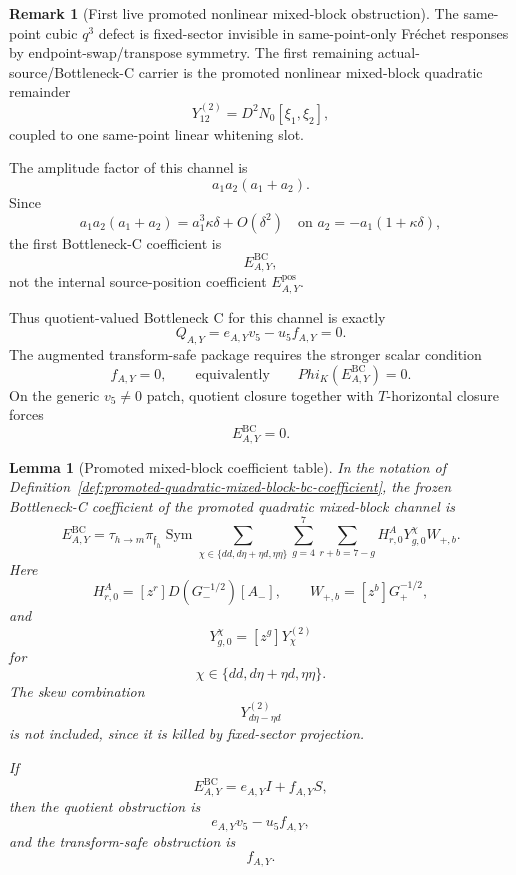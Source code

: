 \documentclass[11pt,a4paper]{amsart}
\def\Phi{Phi}%
\theoremstyle{plain}
\newtheorem{lemma}[theorem]{Lemma}
\theoremstyle{definition}
\newtheorem{remark}[theorem]{Remark}
\begin{document}
\begin{remark}[First live promoted nonlinear mixed-block obstruction]
\label{rem:first-live-promoted-y12-obstruction}
The same-point cubic \(q^3\) defect is fixed-sector invisible in same-point-only
Fr\'echet responses by endpoint-swap/transpose symmetry.  The first remaining
actual-source/Bottleneck-C carrier is the promoted nonlinear mixed-block
quadratic remainder
\[
Y_{12}^{(2)}=D^2N_0[\xi_1,\xi_2],
\]
coupled to one same-point linear whitening slot.

The amplitude factor of this channel is
\[
a_1a_2(a_1+a_2).
\]
Since
\[
a_1a_2(a_1+a_2)
=
a_1^3\kappa\delta+O(\delta^2)
\quad
\text{on }a_2=-a_1(1+\kappa\delta),
\]
the first Bottleneck-C coefficient is
\[
E_{A,Y}^{\mathrm{BC}},
\]
not the internal source-position coefficient \(E_{A,Y}^{\mathrm{pos}}\).

Thus quotient-valued Bottleneck C for this channel is exactly
\[
Q_{A,Y}=e_{A,Y}v_5-u_5f_{A,Y}=0.
\]
The augmented transform-safe package requires the stronger scalar condition
\[
f_{A,Y}=0,
\qquad
\text{equivalently}\qquad
\Phi_K(E_{A,Y}^{\mathrm{BC}})=0.
\]
On the generic \(v_5\ne0\) patch, quotient closure together with
\(T\)-horizontal closure forces
\[
E_{A,Y}^{\mathrm{BC}}=0.
\]
\end{remark}

\begin{lemma}[Promoted mixed-block coefficient table]
\label{lem:promoted-y12-coefficient-table}
In the notation of
Definition~\ref{def:promoted-quadratic-mixed-block-bc-coefficient}, the frozen
Bottleneck-C coefficient of the promoted quadratic mixed-block channel is
\[
E_{A,Y}^{\mathrm{BC}}
=
\tau_{h\to m}\pi_{\mathfrak f_h}
\operatorname{Sym}
\sum_{\chi\in\{dd,d\eta+\eta d,\eta\eta\}}
\sum_{g=4}^{7}
\sum_{r+b=7-g}
H^A_{r,0}Y^\chi_{g,0}W_{+,b}.
\]
Here
\[
H^A_{r,0}
=
[z^r]D(G_-^{-1/2})[A_-],
\qquad
W_{+,b}=[z^b]G_+^{-1/2},
\]
and
\[
Y^\chi_{g,0}=[z^g]Y_\chi^{(2)}
\]
for
\[
\chi\in\{dd,d\eta+\eta d,\eta\eta\}.
\]
The skew combination
\[
Y_{d\eta-\eta d}^{(2)}
\]
is not included, since it is killed by fixed-sector projection.

If
\[
E_{A,Y}^{\mathrm{BC}}=e_{A,Y}I+f_{A,Y}S,
\]
then the quotient obstruction is
\[
e_{A,Y}v_5-u_5f_{A,Y},
\]
and the transform-safe obstruction is
\[
f_{A,Y}.
\]
\end{lemma}
\end{document}
